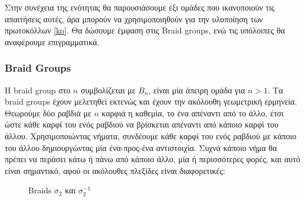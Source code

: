 Στην συνέχεια της ενότητας θα παρουσιάσουμε έξι ομάδες που ικανοποιούν τις απαιτήσεις αυτές, άρα μπορούν να χρησιμοποιηθούν για την υλοποίηση των πρωτοκόλλων \ref{ko}. Θα δώσουμε έμφαση στις Braid groups, ενώ τις υπόλοιπες θα αναφέρουμε επιγραμματικά.

\subsubsection{Braid Groups}

Η braid group στο $ n $ συμβολίζεται με $ B_n $, είναι μία άπειρη ομάδα για $ n>1 $. Τα braid groups έχουν μελετηθεί εκτενώς \cite{normaf,normaltheor,nfobs} και έχουν την ακόλουθη γεωμετρική ερμηνεία.
Θεωρούμε δύο ραβδιά με  $ n $ καρφιά η καθεμία, το ένα απέναντι από το άλλο, έτσι ώστε κάθε καρφί του ενός ραβδιού να βρίσκεται απέναντι από κάποιο καρφί του άλλου. Χρησιμοποιώντας νήματα, συνδέουμε κάθε καρφί του ενός ραβδιού με κάποιο του άλλου  δημιουργώντας μία ένα-προς-ένα αντιστοιχία. Συχνά κάποιο νήμα θα πρέπει να περάσει κάτω ή πάνω από κάποιο άλλο, μία ή περισσότερες φορές, και αυτό είναι σημαντικό, αφού οι ακόλουθες πλεξίδες είναι διαφορετικές:


\begin{figure}[ht]
\caption{Braids $\sigma_2$ και $\sigma_2^{-1} $}
\label{bdio}
\end{figure}

